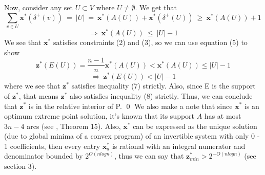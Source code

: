 \documentclass[oneside]{projectpaper} %
\begin{document}
Now, consider any set $U \subset V$ where $U \neq \emptyset$. We get that
\begin{equation*}
\sum\limits_{v \in U}\textbf{x}^*(\delta^+(v)) \ = \  |U| \ = \ \textbf{x}^*(A(U)) + \textbf{x}^*(\delta^+(U)) \ \geq \ \textbf{x}^*(A(U)) + 1
\end{equation*}
\begin{equation*}
\Rightarrow \ \textbf{x}^*(A(U)) \ \leq \ |U| - 1
\end{equation*}
We see that $\textbf{x}^*$ satisfies constraints (2) and (3), so we can use equation (5) to show
\begin{equation*}
\textbf{z}^*(E(U)) = \frac{n - 1}{n}\textbf{x}^*(A(U)) < \textbf{x}^*(A(U)) \leq |U| - 1
\end{equation*}
\begin{equation*}
\Rightarrow \ \textbf{z}^*(E(U)) < |U| - 1
\end{equation*}
where we see that $\textbf{z}^*$ satisfies inequality (7) strictly. Also, since E is the support of $\textbf{z}^*$, that means $\textbf{z}^*$ also satisfies inequality (8) strictly. Thus, we can conclude that $\textbf{z}^*$ is in the relative interior of P. \hfill\qed
\newline
\newline
We also make a note that since $\textbf{x}^*$ is an optimum extreme point solution, it's known that its support $A$ has at most $3n - 4$ arcs (see \cite{Goe06}, Theorem 15). Also, $\textbf{x}^*$ can be expressed as the unique solution (due to global minima of a convex program) of an invertible system with only 0 - 1 coefficients, then every entry $\textbf{x}_{a}^{*}$ is rational with an integral numerator and denominator bounded by $2^{O(nlogn)}$, thus we can say that $\textbf{z}_{min}^{*} > 2^{-O(nlogn)}$ (see \cite{AGM10} section 3).

\end{document}
